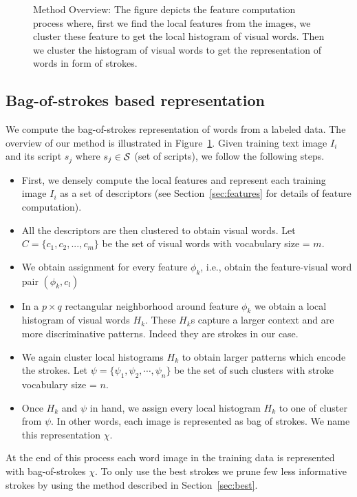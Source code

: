 \begin{figure} [!t]
\centering
{}
\caption{Method Overview: The figure depicts the feature computation process where, first we find the local features from the images, we cluster these feature to get the local histogram of visual words. Then we cluster the histogram of visual words to get the representation of words in form of strokes.}
\label{fig:overview}
\end{figure} 

\subsection{Bag-of-strokes based representation}
\label{sec:bos}
We compute the bag-of-strokes representation of words from a labeled data. The  overview of our method is illustrated in Figure~\ref{fig:overview}. Given training text image $I_i$ and its script $s_j$ where $s_j \in {\cal S}$ (set of scripts), we follow the following steps.
\begin{itemize}
\item First, we densely compute the local features and represent each training image $I_i$ 
as a set of descriptors (see Section~\ref{sec:features} for details of feature computation).
\item All the descriptors are then clustered to obtain visual words. Let $C = \{c_1,c_2,...,c_m\}$ be the set of visual words with vocabulary size = $m$. 
\item We obtain assignment for every feature $\phi_k$, i.e., obtain the feature-visual word pair $(\phi_k, c_l)$
\item In a $p \times q$ rectangular neighborhood around feature $\phi_k$ we obtain a local histogram of visual words $H_k$. These $H_k$s capture a larger context and are
more discriminative patterns. Indeed they are strokes in our case. 
\item We again cluster local histograms $H_k$ to obtain larger patterns which encode the
strokes. Let $\psi = \{\psi_1, \psi_2, \cdots ,\psi_n\}$ be the set of such clusters with stroke vocabulary size = $n$.
\item Once $H_k$ and $\psi$ in hand, we assign every local histogram $H_k$ to one of cluster from $\psi$. In other words, each image is represented as bag of strokes. We
name this representation $\chi$.
\end{itemize}  
At the end of this process each word image in the training data is represented with bag-of-strokes $\chi$. To only use the best strokes we prune few less informative strokes by using the method described in Section~\ref{sec:best}.


